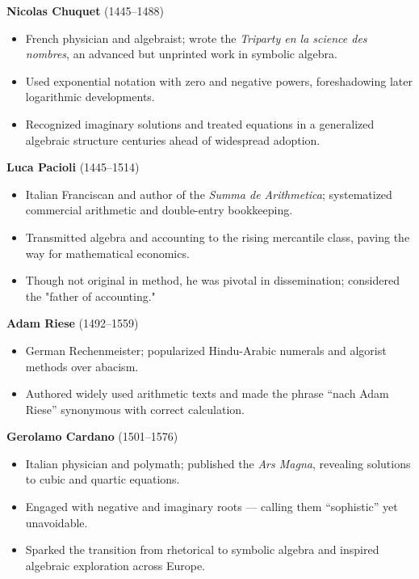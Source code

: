 \documentclass[9pt]{article}
\begin{document}
\textbf{Nicolas Chuquet} (1445–1488)

\begin{itemize}
    \item French physician and algebraist; wrote the \textit{Triparty en la science des nombres}, an advanced but unprinted work in symbolic algebra.
    \item Used exponential notation with zero and negative powers, foreshadowing later logarithmic developments.
    \item Recognized imaginary solutions and treated equations in a generalized algebraic structure centuries ahead of widespread adoption.
\end{itemize}

\textbf{Luca Pacioli} (1445–1514)

\begin{itemize}
    \item Italian Franciscan and author of the \textit{Summa de Arithmetica}; systematized commercial arithmetic and double-entry bookkeeping.
    \item Transmitted algebra and accounting to the rising mercantile class, paving the way for mathematical economics.
    \item Though not original in method, he was pivotal in dissemination; considered the "father of accounting."
\end{itemize}

\textbf{Adam Riese} (1492–1559)

\begin{itemize}
    \item German Rechenmeister; popularized Hindu-Arabic numerals and algorist methods over abacism.
    \item Authored widely used arithmetic texts and made the phrase “nach Adam Riese” synonymous with correct calculation.
\end{itemize}

\textbf{Gerolamo Cardano} (1501–1576)

\begin{itemize}
    \item Italian physician and polymath; published the \textit{Ars Magna}, revealing solutions to cubic and quartic equations.
    \item Engaged with negative and imaginary roots — calling them “sophistic” yet unavoidable.
    \item Sparked the transition from rhetorical to symbolic algebra and inspired algebraic exploration across Europe.
\end{itemize}
\end{document}

